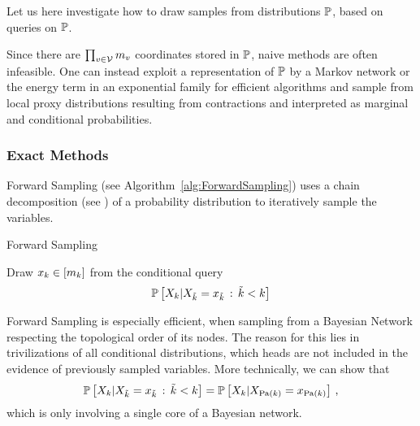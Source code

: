 Let us here investigate how to draw samples from distributions $\mathbb{P}$, based on queries on $\mathbb{P}$.

Since there are $\prod_{v\in\mathcal{V}}m_{v}$ coordinates stored in $\mathbb{P}$, naive methods are often infeasible.
One can instead exploit a representation of $\mathbb{P}$ by a Markov network or the energy term in an exponential family for efficient algorithms and sample from local proxy distributions resulting from contractions and interpreted as marginal and conditional probabilities.

\subsubsection{Exact Methods}

Forward Sampling (see Algorithm~\ref{alg:ForwardSampling}) uses a chain decomposition (see ) of a probability distribution to iteratively sample the variables.

\begin{algorithm}[hbt!]
\caption{Forward Sampling}\label{alg:ForwardSampling}
\begin{algorithmic}
\For{$\catenumeratorin$}
	\State Draw $x_{k}\in[m_{k}]$ from the conditional query
		\[ \mathbb{P}\left[X_{k}|X_{\tilde{k}}=x_{\tilde{k}} \, : \, \tilde{k} < k\right] \]
\EndFor
\end{algorithmic}
\end{algorithm}

%
Forward Sampling is especially efficient, when sampling from a Bayesian Network respecting the topological order of its nodes.
The reason for this lies in trivilizations of all conditional distributions, which heads are not included in the evidence of previously sampled variables.
More technically, we can show that
	\[ \mathbb{P}\left[X_{k}|X_{\tilde{k}}=x_{\tilde{k}} \, : \, \tilde{k} < k\right]  
	= \mathbb{P}\left[X_{k}|X_{\mathrm{Pa}(k)}=x_{\mathrm{Pa}(k)}\right] \, , \]
which is only involving a single core of a Bayesian network.



